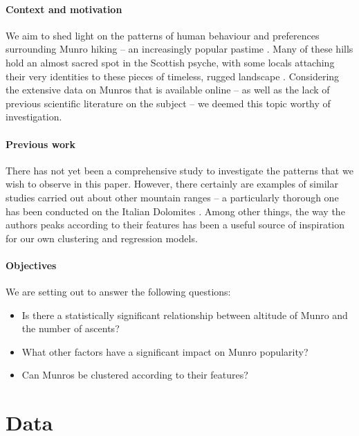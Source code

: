 \documentclass[11pt,a4paper]{article}
\begin{document}
\paragraph{Context and motivation}

We aim to shed light on the patterns of human behaviour and preferences surrounding Munro hiking – an increasingly popular pastime \cite{CSM}. Many of these hills hold an almost sacred spot in the Scottish psyche, with some locals attaching their very identities to these pieces of timeless, rugged landscape \cite{HAE}. Considering the extensive data on Munros that is available online – as well as the lack of previous scientific literature on the subject – we deemed this topic worthy of investigation.

\paragraph{Previous work}
There has not yet been a comprehensive study to investigate the patterns that we wish to observe in this paper. However, there certainly are examples of similar studies carried out about other mountain ranges – a particularly thorough one has been conducted on the Italian Dolomites \cite{HitA}. Among other things, the way the authors  peaks according to their features has been a useful source of inspiration for our own clustering and  regression models. 

\paragraph{Objectives}

We are setting out to answer the following questions:
\begin{itemize}
    \item Is there a statistically significant relationship between altitude of Munro and the number of ascents?
    \item What other factors have a significant impact on Munro popularity?
    \item Can Munros be clustered according to their features?
\end{itemize}

\section{Data}
\end{document}

